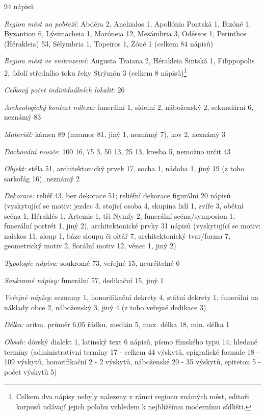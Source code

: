 \placetable[none]{}
\starttable[|l|]
\HL
{} 94 nápisů

{\em Region měst na pobřeží:} Abdéra 2, Anchialos 1, Apollónia Pontská 1, Bizóné 1, Byzantion 6, Lýsimacheia 1, Maróneia 12, Mesámbria 3, Odéssos 1, Perinthos (Hérakleia) 53, Sélymbria 1, Topeiros 1, Zóné 1 (celkem 84 nápisů)

{\em Region měst ve vnitrozemí:} Augusta Traiana 2, Hérakleia Sintská 1, Filippopolis 2, údolí středního toku řeky Strýmón 3 (celkem 8 nápisů)\footnote{Celkem dva nápisy nebyly nalezeny v rámci regionu známých měst, editoři korpusů udávají jejich polohu vzhledem k nejbližšímu modernímu sídlišti.}

{\em Celkový počet individuálních lokalit}: 26

{\em Archeologický kontext nálezu:} funerální 1, sídelní 2, náboženský 2, sekundární 6, neznámý 83

{\em Materiál:} kámen 89 (mramor 81, jiný 1, neznámý 7), kov 2, neznámý 3

{\em Dochování nosiče}: 100  16, 75  3, 50  13, 25  13, kresba 5, nemožno určit 43

{\em Objekt:} stéla 51, architektonický prvek 17, socha 1, nádoba 1, jiný 19 (z toho sarkofág 16), neznámý 2

{\em Dekorace:} reliéf 43, bez dekorace 51; reliéfní dekorace figurální 20 nápisů (vyskytující se motiv: jezdec 3, stojící osoba 4, skupina lidí 1, zvíře 3, obětní scéna 1, Héraklés 1, Artemis 1, tři Nymfy 2, funerální scéna/symposion 1, funerální portrét 1, jiný 2), architektonické prvky 31 nápisů (vyskytující se motiv: naiskos 11, sloup 1, báze sloupu či oltář 7, architektonický tvar/forma 7, geometrický motiv 2, florální motiv 12, věnec 1, jiný 2)

{\em Typologie nápisu:} soukromé 73, veřejné 15, neurčitelné 6

{\em Soukromé nápisy:} funerální 57, dedikační 15, jiný 1

{\em Veřejné nápisy:} seznamy 1, honorifikační dekrety 4, státní dekrety 1, funerální na náklady obce 2, náboženský 3, jiný 4 (z toho veřejné dedikace 3)

{\em Délka:} aritm. průměr 6,05 řádku, medián 5, max. délka 18, min. délka 1

{\em Obsah:} dórský dialekt 1, latinský text 6 nápisů, písmo římského typu 14; hledané termíny (administrativní termíny 17 - celkem 44 výskytů, epigrafické formule 18 - 109 výskytů, honorifikační 2 - 2 výskytů, náboženské 20 - 35 výskytů, epiteton 5 - počet výskytů 5)


